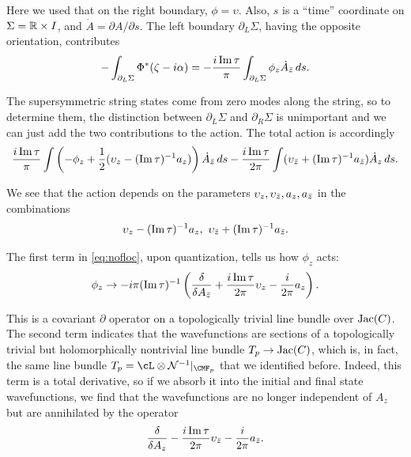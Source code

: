Here we used that on the right boundary, $\phi=\upsilon$.
Also, $s$ is a ``time'' coordinate on $\Sigma=\Bbb{R}\times I$, and
$\dot A=\partial A/\partial s$.
 The left boundary $\partial_L\Sigma$, having the opposite orientation,
contributes
\setcounter{equation}{20}
\begin{equation}\label{eq:bofloc}
-\int_{\partial_L\Sigma} \Phi^*(\zeta-i\alpha)=-{i\,{\rm Im}\,\tau\over \pi}\int_{\partial_L\Sigma}
 \phi_z
\dot{A}_{\bar z}\,ds.
\end{equation}

The supersymmetric string states come from zero modes along the string, so to determine
them, the distinction
between $\partial_L\Sigma$ and $\partial_R\Sigma$ is unimportant and we can just add
the two contributions to the action.
The total action is accordingly
\setcounter{equation}{21}
\begin{equation}\label{eq:nofloc}
{i\,{\rm Im}\,\tau\over \pi}\int \left(-\phi_z+{1\over
2}(\upsilon_z-({\rm Im}\,\tau)^{-1}a_z)\right)\dot{A}_{\bar z} \,ds-{i\,{\rm Im}\,\tau\over
2\pi}\int(\upsilon_{\bar z}+({\rm Im}\,\tau)^{-1}a_{\bar z}) \dot{A}_z\,ds.
\end{equation}

We see that the action depends on the parameters
$\upsilon_z,\upsilon_{\bar z},a_z,a_{\bar z}$ in the combinations
\setcounter{equation}{22}
\begin{equation}\label{eq:numiko}
\upsilon_z-(\Im\,\tau)^{-1}a_z,\ \upsilon_\bz+(\Im\,\tau)^{-1}a_\bz.
\end{equation}

The first term in \eqref{eq:nofloc}, upon quantization, tells us how $\phi_z$ acts:
\setcounter{equation}{23}
\begin{equation}\label{eq:xococox}
\phi_z\to -i\pi({\rm Im}\,\tau)^{-1}\left({\delta\over\delta
A_{\bar z}}+{i\,{\rm Im}\,\tau\over 2\pi}\upsilon_z-{i\over 2\pi} a_z\right).
\end{equation}

This is a covariant $\partial$ operator on a topologically trivial line bundle
over ${\rm Jac}(C)$. The second term indicates that the
wavefunctions are sections of a topologically trivial but holomorphically nontrivial
 line bundle
 $T_p\to{\rm Jac}(C)$, which is, in fact, the same line bundle $T_p=\cL\otimes
{\cal N}^{-1}\vert_{{\CMF}_p}$ that we identified
 before. Indeed, this term is a total derivative, so if
we absorb it into the initial and final state wavefunctions, we
find that the wavefunctions are no longer independent of $A_z$ but
are annihilated by the operator
\setcounter{equation}{24}
\begin{equation}\label{eq:bilbox}
{\delta\over\delta A_z}-{i\,{\rm Im}\,\tau\over 2\pi}\upsilon_{\bar z}-{i\over
2\pi} a_{\bar z} .
\end{equation}

